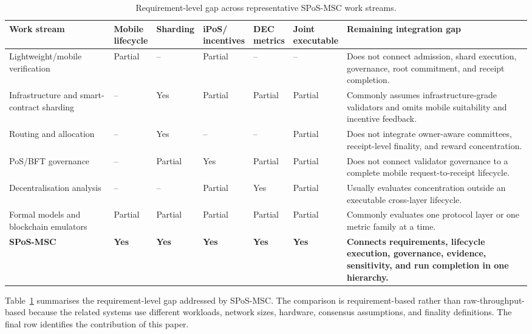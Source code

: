 \documentclass[a4paper,fleqn]{cas-sc}
\begin{document}
\begin{table}[pos=t]
\centering
\caption{Requirement-level gap across representative SPoS-MSC work streams.}
\label{tab:rw_gap}
\scriptsize
\setlength{\tabcolsep}{3.2pt}
\renewcommand{\arraystretch}{1.10}
\begin{tabularx}{\textwidth}{p{3.05cm}*{5}{>{\centering\arraybackslash}p{1.45cm}}X}
\toprule
\textbf{Work stream} &
\shortstack{\textbf{Mobile}\\\textbf{lifecycle}} &
\textbf{Sharding} &
\shortstack{\textbf{iPoS/}\\\textbf{incentives}} &
\shortstack{\textbf{DEC}\\\textbf{metrics}} &
\shortstack{\textbf{Joint}\\\textbf{executable}} &
\textbf{Remaining integration gap}\\
\midrule
Lightweight/mobile verification & Partial & -- & Partial & -- & -- &
Does not connect admission, shard execution, governance, root commitment, and receipt completion.\\
Infrastructure and smart-contract sharding & -- & Yes & Partial & Partial & Partial &
Commonly assumes infrastructure-grade validators and omits mobile suitability and incentive feedback.\\
Routing and allocation & -- & Yes & -- & -- & Partial &
Does not integrate owner-aware committees, receipt-level finality, and reward concentration.\\
PoS/BFT governance & -- & Partial & Yes & Partial & Partial &
Does not connect validator governance to a complete mobile request-to-receipt lifecycle.\\
Decentralisation analysis & -- & -- & Partial & Yes & Partial &
Usually evaluates concentration outside an executable cross-layer lifecycle.\\
Formal models and blockchain emulators & Partial & Partial & Partial & Partial & Partial &
Commonly evaluates one protocol layer or one metric family at a time.\\
\textbf{SPoS-MSC} & \textbf{Yes} & \textbf{Yes} & \textbf{Yes} & \textbf{Yes} & \textbf{Yes} &
\textbf{Connects requirements, lifecycle execution, governance, evidence, sensitivity, and run completion in one hierarchy.}\\
\bottomrule
\end{tabularx}
\end{table}

Table~\ref{tab:rw_gap} summarises the requirement-level gap addressed by SPoS-MSC. The comparison is requirement-based rather than raw-throughput-based because the related systems use different workloads, network sizes, hardware, consensus assumptions, and finality definitions. The final row identifies the contribution of this paper.
\end{document}
